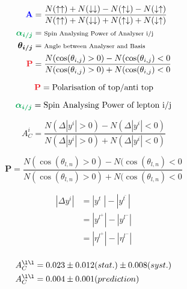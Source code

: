 \begin{equation}
	\begin{aligned}
	    	\textcolor{blue}{\mathbf{A}} &=\frac{N(\uparrow \uparrow) + N(\downarrow \downarrow) - N(\uparrow \downarrow) - N(\downarrow \uparrow)}{N(\uparrow \uparrow) + N(\downarrow \downarrow) + N(\uparrow \downarrow) + N(\downarrow \uparrow)} \\
		\textcolor{Green}{\boldsymbol{\alpha_{i/j}}} &= \text{\scriptsize{Spin Analysing Power of Analyser i/j}} \\
		\boldsymbol{\theta_{i/j}} &= \text{\scriptsize{Angle between Analyser and Basis}}\\
                \textcolor{Red}{\mathbf{P}} &= \frac{N(\cos(\theta_{i,j}) > 0) - N(\cos(\theta_{i,j}) < 0}{N(\cos(\theta_{i,j}) > 0) + N(\cos(\theta_{i,j}) < 0} \\
	\end{aligned}
\end{equation}

\begin{equation}
    \textcolor{Red}{\mathbf{P}} = \text{Polarisation of top/anti top}
\end{equation}

\begin{equation}
    \textcolor{Green}{\boldsymbol{\alpha_{i/j}}} = \text{Spin Analysing Power of lepton i/j}
\end{equation}

\begin{equation}
	A^{i}_{C} = \frac{N(\Delta |y^i| > 0) - N(\Delta |y^i| < 0)}{N(\Delta |y^i| > 0) + N(\Delta |y^i| < 0)}
\end{equation}

\begin{equation}
	\mathbf{P} = \frac{N(\cos(\theta_{l,n}) > 0) - N(\cos(\theta_{l,n}) < 0}{N(\cos(\theta_{l,n}) > 0) + N(\cos(\theta_{l,n}) < 0}
\end{equation}

\begin{equation}
	\begin{aligned}
	|\Delta y^i | &= |y^{t~~}| - |y^{\bar{t~~}}| \\
	                 &= |y^{l^{+}}| - |y^{l^{-}}| \\
	                 &= |\eta^{l^{+}}| - |\eta^{l^{-}}| \\
	\end{aligned}
\end{equation}


\begin{equation}
	\begin{aligned}
	A^{\l\l}_C &= 0.023 \pm 0.012 (stat.) \pm 0.008 (syst.) \\
	A^{\l\l}_C &= 0.004 \pm 0.001 (prediction)
	\end{aligned}
\end{equation}

